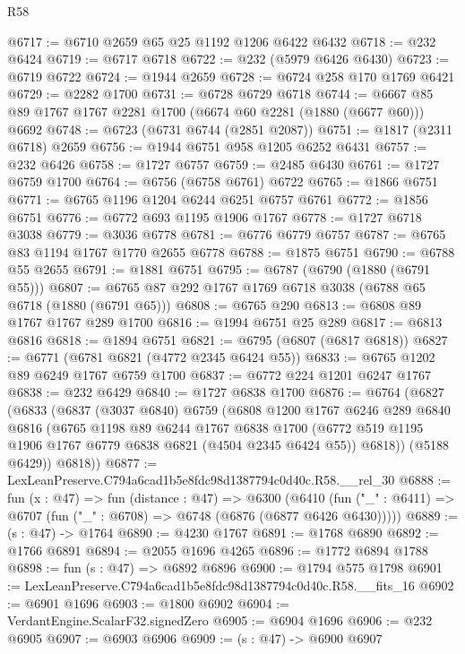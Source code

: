 \begin{lexlean}{R58}
\begin{coremodule}
@6717 := @6710 @2659 @65 @25 @1192 @1206 @6422 @6432
@6718 := @232 @6424
@6719 := @6717 @6718
@6722 := @232 (@5979 @6426 @6430)
@6723 := @6719 @6722
@6724 := @1944 @2659
@6728 := @6724 @258 @170 @1769 @6421
@6729 := @2282 @1700
@6731 := @6728 @6729 @6718
@6744 := @6667 @85 @89 @1767 @1767 @2281 @1700 (@6674 @60 @2281 (@1880 (@6677 @60))) @6692
@6748 := @6723 (@6731 @6744 (@2851 @2087))
@6751 := @1817 (@2311 @6718) @2659
@6756 := @1944 @6751 @958 @1205 @6252 @6431
@6757 := @232 @6426
@6758 := @1727 @6757
@6759 := @2485 @6430
@6761 := @1727 @6759 @1700
@6764 := @6756 (@6758 @6761) @6722
@6765 := @1866 @6751
@6771 := @6765 @1196 @1204 @6244 @6251 @6757 @6761
@6772 := @1856 @6751
@6776 := @6772 @693 @1195 @1906 @1767
@6778 := @1727 @6718 @3038
@6779 := @3036 @6778
@6781 := @6776 @6779 @6757
@6787 := @6765 @83 @1194 @1767 @1770 @2655 @6778
@6788 := @1875 @6751
@6790 := @6788 @55 @2655
@6791 := @1881 @6751
@6795 := @6787 (@6790 (@1880 (@6791 @55)))
@6807 := @6765 @87 @292 @1767 @1769 @6718 @3038 (@6788 @65 @6718 (@1880 (@6791 @65)))
@6808 := @6765 @290
@6813 := @6808 @89 @1767 @1767 @289 @1700
@6816 := @1994 @6751 @25 @289
@6817 := @6813 @6816
@6818 := @1894 @6751
@6821 := @6795 (@6807 (@6817 @6818))
@6827 := @6771 (@6781 @6821 (@4772 @2345 @6424 @55))
@6833 := @6765 @1202 @89 @6249 @1767 @6759 @1700
@6837 := @6772 @224 @1201 @6247 @1767
@6838 := @232 @6429
@6840 := @1727 @6838 @1700
@6876 := @6764
    (@6827
      (@6833
        (@6837
          (@3037 @6840)
          @6759
          (@6808
            @1200
            @1767
            @6246
            @289
            @6840
            @6816
            (@6765
              @1198
              @89
              @6244
              @1767
              @6838
              @1700
              (@6772 @519 @1195 @1906 @1767 @6779 @6838 @6821 (@4504 @2345 @6424 @55))
              @6818))
          (@5188 @6429))
        @6818))
@6877 := LexLeanPreserve.C794a6cad1b5e8fdc98d1387794c0d40c.R58.__rel_30
@6888 := fun (x : @47) =>
  fun (distance : @47) =>
  @6300
    (@6410 (fun ("_" : @6411) => @6707 (fun ("_" : @6708) => @6748 (@6876 (@6877 @6426 @6430)))))
@6889 := (s : @47) -> @1764
@6890 := @4230 @1767
@6891 := @1768 @6890
@6892 := @1766 @6891
@6894 := @2055 @1696 @4265
@6896 := @1772 @6894 @1788
@6898 := fun (s : @47) => @6892 @6896
@6900 := @1794 @575 @1798
@6901 := LexLeanPreserve.C794a6cad1b5e8fdc98d1387794c0d40c.R58.__fits_16
@6902 := @6901 @1696
@6903 := @1800 @6902
@6904 := VerdantEngine.ScalarF32.signedZero
@6905 := @6904 @1696
@6906 := @232 @6905
@6907 := @6903 @6906
@6909 := (s : @47) -> @6900 @6907

\end{coremodule}
\end{lexlean}

